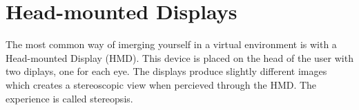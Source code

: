 \section{Head-mounted Displays}
The most common way of imerging yourself in a virtual environment is with a Head-mounted Display (HMD). This device is placed on the head of the user with two diplays, one for each eye. The displays produce slightly different images which creates a stereoscopic view when percieved through the HMD. The experience is called stereopsis. \cite{HMD:goldstein2016sensation} 
